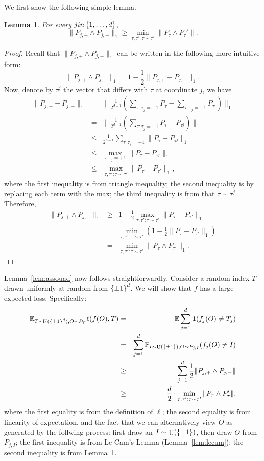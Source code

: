 \documentclass{article}
\newtheorem{lemma}{Lemma}
\DeclareMathOperator*{\U}{{\rm U}}
\newcommand{\EE}{\mathbb{E}}
\newcommand{\PP}{\mathbb{P}}
\newcommand*{\one}{{\bf 1}}
\begin{document}
We first show the following simple lemma.
\begin{lemma}
For every $j in \cbr{1,\ldots, d}$,
\[ \| P_{j,+} \wedge P_{j,-} \|_1 \geq \min_{\tau, \tau': \tau \sim \tau'} \| P_\tau \wedge P_\tau' \|. \]
\label{lem:coord-neigh}
\end{lemma}
\begin{proof}
Recall that $\| P_{j,+} \wedge P_{j,-} \|_1$ can be written in the following more intuitive form:
\[ \| P_{j,+} \wedge P_{j,-} \|_1 = 1 - \frac12 \| P_{j,+} - P_{j,-} \|_1. \]
Now, denote by $\tau^j$ the vector that differs with $\tau$ at coordinate $j$, we have
\begin{eqnarray*}
  \| P_{j,+} - P_{j,-} \|_1
   &=& \| \frac{1}{2^{d-1}} (\sum_{\tau: \tau_j = +1} P_{\tau} - \sum_{\tau: \tau_j = -1} P_{\tau'}) \|_1 \\
   &=& \| \frac{1}{2^{d-1}} (\sum_{\tau: \tau_j = +1} P_{\tau} - P_{\tau^j}) \|_1 \\
   &\leq& \frac{1}{2^{d-1}} \sum_{\tau: \tau_j = +1} \| P_{\tau} - P_{\tau^j} \|_1 \\
   &\leq& \max_{\tau: \tau_j = +1} \| P_{\tau} - P_{\tau^j} \|_1 \\
   &\leq& \max_{\tau, \tau': \tau \sim \tau'} \| P_{\tau} - P_{\tau'} \|_1,
\end{eqnarray*}
where the first inequality is from triangle inequality; the second inequality is by replacing each term with the max; the third inequality is from that $\tau \sim \tau^j$.
Therefore,
\begin{eqnarray*}
  \| P_{j,+} \wedge P_{j,-} \|_1
  &\geq& 1 - \frac12 \max_{\tau, \tau': \tau \sim \tau'} \| P_{\tau} - P_{\tau'} \|_1 \\
  &=& \min_{\tau, \tau': \tau \sim \tau'} (1 - \frac12 \| P_{\tau} - P_{\tau'} \|_1) \\
  &=& \min_{\tau, \tau': \tau \sim \tau'} \| P_\tau \wedge P_{\tau'} \|_1.
\end{eqnarray*}
\end{proof}

Lemma~\ref{lem:assouad} now follows straightforwardly. Consider a random index $T$ drawn uniformly at random from $\cbr{\pm 1}^d$. We will show that $f$ has a large expected loss.
Specifically:
\begin{eqnarray*}
  \EE_{T \sim U(\cbr{\pm 1}^d), O \sim P_T} \ell(f(O), T)
  &=& \EE \sum_{j=1}^d \one(f_j(O) \neq T_j) \\
  &=& \sum_{j=1}^d \PP_{I \sim \U(\cbr{\pm 1}), O \sim P_{j,I}}(f_j(O) \neq I) \\
  &\geq& \sum_{j=1}^d \frac12 \| P_{j,+} \wedge P_{j,-} \| \\
  &\geq& \frac{d}{2} \cdot \min_{\tau, \tau': \tau \sim \tau'} \| P_\tau \wedge P_\tau' \|,
\end{eqnarray*}
where the first equality is from the definition of $\ell$; the second equality is from linearity of expectation, and the fact that we can alternatively view $O$ as generated by the follwing process: first draw an $I \sim \U(\cbr{\pm 1})$, then draw $O$ from $P_{j,I}$;
the first inequality is from Le Cam's Lemma (Lemma~\ref{lem:lecam}); the second inequality is from Lemma~\ref{lem:coord-neigh}.
\end{document}
